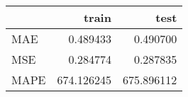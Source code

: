 \begin{tabular}{lrr}
\toprule
{} &       train &        test \\
\midrule
MAE  &    0.489433 &    0.490700 \\
MSE  &    0.284774 &    0.287835 \\
MAPE &  674.126245 &  675.896112 \\
\bottomrule
\end{tabular}
